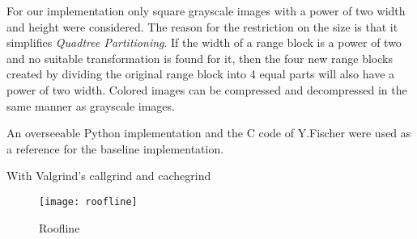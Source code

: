  For our implementation only square grayscale images with a power
of two width and height were considered. The reason for the restriction on the
size is that it simplifies \textit{Quadtree Partitioning}. If the width of a
range block is a power of two and no suitable transformation is found for it,
then the four new range blocks created by dividing the original range block into
4 equal parts will also have a power of two width. Colored images can be
compressed and decompressed in the same manner as grayscale images.


 An overseeable Python implementation and the C
code of Y.Fischer were used as a reference for the baseline implementation.


 With Valgrind's callgrind and cachegrind


\begin{figure}
  \texttt{[image: roofline]}
  \caption{Roofline}
\end{figure}




